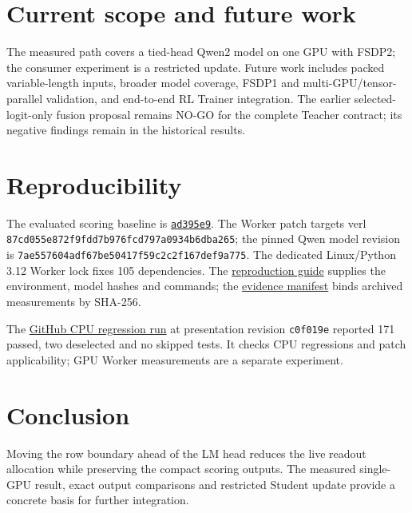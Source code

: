 \documentclass[11pt,a4paper]{article}
\newcommand{\code}[1]{{\small\nolinkurl{#1}}}
\begin{document}
\section{Current scope and future work}
The measured path covers a tied-head Qwen2 model on one GPU with FSDP2; the consumer experiment is a restricted update. Future work includes packed variable-length inputs, broader model coverage, FSDP1 and multi-GPU/tensor-parallel validation, and end-to-end RL Trainer integration. The earlier selected-logit-only fusion proposal remains NO-GO for the complete Teacher contract; its negative findings remain in the historical results.

\section{Reproducibility}
The evaluated scoring baseline is \href{https://github.com/yu830/rl-posttrain-sparse-scoring/commit/ad395e94923bcf65fff4bc1eeb2e0e1505fd4f91}{\code{ad395e9}}. The Worker patch targets verl \code{87cd055e872f9fdd7b976fcd797a0934b6dba265}; the pinned Qwen model revision is \code{7ae557604adf67be50417f59c2c2f167def9a775}. The dedicated Linux/Python 3.12 Worker lock fixes 105 dependencies. The \href{https://github.com/yu830/rl-posttrain-sparse-scoring/blob/main/docs/experimental-reproduction.md}{reproduction guide} supplies the environment, model hashes and commands; the \href{https://github.com/yu830/rl-posttrain-sparse-scoring/blob/main/results/worker-evidence-manifest.json}{evidence manifest} binds archived measurements by SHA-256.

The \href{https://github.com/yu830/rl-posttrain-sparse-scoring/actions/runs/41170230693}{GitHub CPU regression run} at presentation revision \code{c0f019e} reported 171 passed, two deselected and no skipped tests. It checks CPU regressions and patch applicability; GPU Worker measurements are a separate experiment.

\section{Conclusion}
Moving the row boundary ahead of the LM head reduces the live readout allocation while preserving the compact scoring outputs. The measured single-GPU result, exact output comparisons and restricted Student update provide a concrete basis for further integration.

\begingroup\small\setlength{\bibsep}{0pt}


\endgroup
\end{document}
